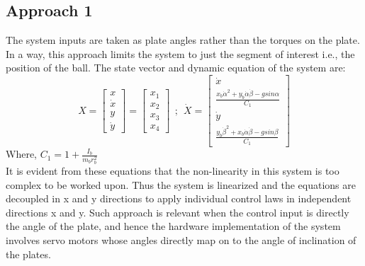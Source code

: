 \documentclass[conference]{IEEEtran}
\begin{document}
\subsection*{Approach 1}
The system inputs are taken as plate angles rather than the torques on the plate. In a way, this approach limits the system to just the segment of interest i.e., the position of the ball. The state vector and dynamic equation of the system are:
\begin{equation} X = \begin{bmatrix}
x \\ \dot x \\ y \\ \dot y
\end{bmatrix} = 
\begin{bmatrix}
x_{1} \\ x_{2} \\ x_{3} \\ x_{4}
\end{bmatrix} \>\>;\>\>
\dot X = \begin{bmatrix}
\dot x \\ \frac{x_{b} \dot \alpha^{2} + y_{b} \dot \alpha \dot \beta - gsin\alpha}{C_{1}} \\ \dot y \\ \frac{y_{b} \dot \beta^{2} + x_{b} \dot \alpha \dot \beta - gsin\beta}{C_{1}}
\end{bmatrix}\label{eq13}
\end{equation} 
Where, $C_{1} = 1+\frac{I_{b}}{m_{b} r_{b}^{2}}$\\
It is evident from these equations that the non-linearity in this system is too complex to be worked upon. Thus the system is linearized and the equations are decoupled in x and y directions to apply individual control laws in independent directions x and y. Such approach is relevant when the control input is directly the angle of the plate, and hence the hardware implementation of the system involves servo motors whose angles directly map on to the angle of inclination of the plates.
\end{document}
